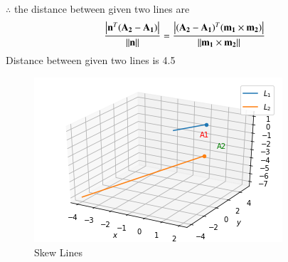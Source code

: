 \documentclass[journal,12pt,twocolumn]{IEEEtran}
\begin{document}
\\
$\therefore$ the distance between given two lines are
\begin{align}
\frac{\left\vert\mathbf{n}^T(\mathbf{A_2}-\mathbf{A_1})\right\vert}{\left\lVert\mathbf{n}\right\rVert} = \frac{\left\vert(\mathbf{A_2}-\mathbf{A_1})^T(\mathbf{m_1} \times \mathbf{ m_2})\right\vert}{\left\lVert\mathbf{m_1} \times \mathbf{m_2}\right\rVert}
\end{align}
Distance between given two lines is 4.5
\begin{figure}[!ht]
\centering
\includegraphics[width=\columnwidth]{download (7).png}
\caption{Skew Lines}
\label{fig: Skew Lines}	
\end{figure}
\end{document}
